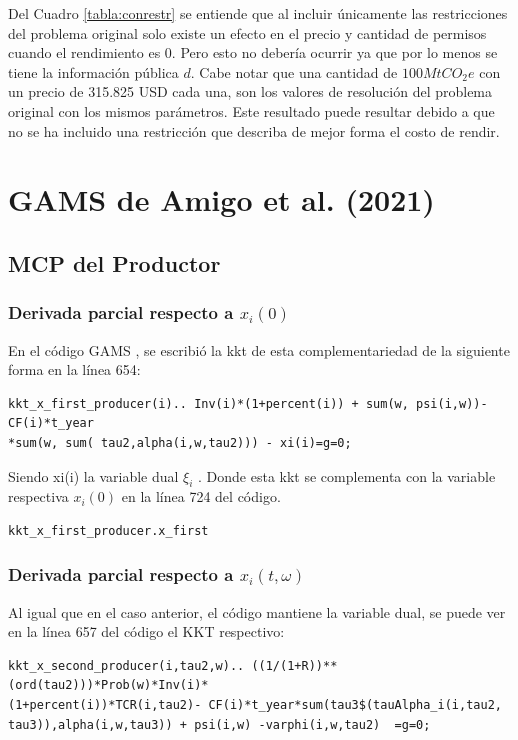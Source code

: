 Del Cuadro \ref{tabla:conrestr} se entiende que al incluir únicamente las restricciones del problema original solo existe un efecto en el precio y cantidad de permisos cuando el rendimiento es 0. Pero esto no debería ocurrir ya que por lo menos se tiene la información pública $d$. Cabe notar que una cantidad de $100 MtCO_2 e$ con un precio de 315.825 USD cada una, son los valores de resolución del problema original con los mismos parámetros. Este resultado puede resultar debido a que no se ha incluido una restricción que describa de mejor forma el costo de rendir.

\section{GAMS de Amigo et al. (2021)}\label{anexo:GAMScomp}
\subsection{MCP del Productor}

\subsubsection{Derivada parcial respecto a $x_i(0)$}

En el código GAMS , se escribió la kkt de esta complementariedad de la siguiente forma en la línea 654:
\begin{verbatim}
kkt_x_first_producer(i).. Inv(i)*(1+percent(i)) + sum(w, psi(i,w))- CF(i)*t_year
*sum(w, sum( tau2,alpha(i,w,tau2))) - xi(i)=g=0;
\end{verbatim}
Siendo xi(i) la variable dual $\xi_i$ . Donde esta kkt se complementa con la variable respectiva $x_i(0)$ en la línea 724 del código.
\begin{verbatim}
kkt_x_first_producer.x_first
\end{verbatim}

\subsubsection{Derivada parcial respecto a $x_i(t,\omega)$}

Al igual que en el caso anterior, el código mantiene la variable dual, se puede ver en la línea 657 del código el KKT respectivo:

\begin{verbatim}
kkt_x_second_producer(i,tau2,w).. ((1/(1+R))**(ord(tau2)))*Prob(w)*Inv(i)*
(1+percent(i))*TCR(i,tau2)- CF(i)*t_year*sum(tau3$(tauAlpha_i(i,tau2,
tau3)),alpha(i,w,tau3)) + psi(i,w) -varphi(i,w,tau2)  =g=0;
\end{verbatim}

